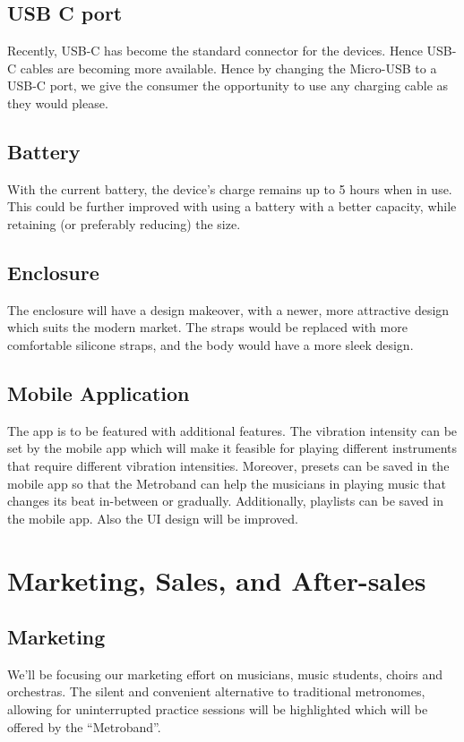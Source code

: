 \documentclass{article}
\begin{document}
        \subsection{USB C port}
        Recently, USB-C has become the standard connector for the devices. Hence USB-C cables are becoming more available. Hence by changing the Micro-USB to a USB-C port, we give the consumer the opportunity to use any charging cable as they would please.

        \subsection{Battery}
        With the current battery, the device’s charge remains up to 5 hours when in use. This could be further improved with using a battery with a better capacity, while retaining (or preferably reducing) the size.

        \subsection{Enclosure}
        The enclosure will have a design makeover, with a newer, more attractive design which suits the modern market. The straps would be replaced with more comfortable silicone straps, and the body would have a more sleek design.

        \subsection{Mobile Application}
        The app is to be  featured with additional features. The vibration intensity can be set by the mobile app which will make it feasible for playing different instruments that require different vibration intensities. Moreover, presets can be saved in the mobile app so that the Metroband can help the musicians in playing music that changes its beat in-between or  gradually. Additionally, playlists can be saved in the mobile app. Also the UI design will be improved.


        \section{Marketing, Sales, and After-sales}
        \subsection{Marketing}
        We’ll be focusing our marketing effort on musicians, music students, choirs and orchestras. The silent and convenient alternative to traditional metronomes, allowing for uninterrupted practice sessions will be highlighted which will be offered by the “Metroband”.\\
        
\end{document}
